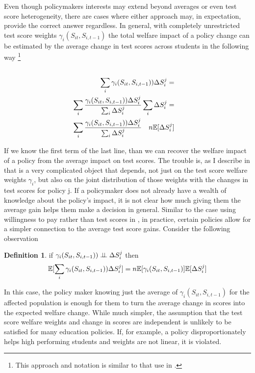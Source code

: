 \documentclass[12pt]{article}
\theoremstyle{definition}
\theoremstyle{definition}
\theoremstyle{definition}
\theoremstyle{definition}
\newtheorem{definition}{Definition}
\begin{document}
    Even though policymakers interests may extend beyond averages or even test score heterogeneity, there are cases where either approach may, in expectation, provide the correct answer regardless. In general, with completely unrestricted test score weights $\gamma_i(S_{it}, S_{i,t-1})$ the total welfare impact of a policy change can be estimated by the average change in test scores across students in the following way \footnote{This approach and notation is similar to that use in \cite{Keyser_2020}. }
    \large
    \begin{align*}
       \\ \sum_i \gamma_i(S_{it}, S_{i,t-1})) \Delta S_i^j =&
       \\ \sum_i \frac{\gamma_i(S_{it}, S_{i,t-1}))\Delta S_i^j}{\sum_i \Delta S_i^j} \sum_i \Delta S_i^j =&
       \\ \sum_i \frac{\gamma_i(S_{it}, S_{i,t-1}))\Delta S_i^j}{\sum_i \Delta S_i^j} \quad n \mathbb{E}[\Delta S_i^j] 
    \end{align*}
      \normalsize 
    
    If we know the first term of the last line, than we can recover the welfare impact of a policy from the average impact on test scores. The trouble is, as I describe in \citet{mather_2022} that is a very complicated object that depends, not just on the test score welfare weights $\gamma_i$, but also on the joint distribution of those weights with the changes in test scores for policy j. If a policymaker does not already have a wealth of knowledge about the policy's impact, it is not clear how much giving them the average gain helps them make a decision in general. Similar to the case using willingness to pay rather than test scores in \citet{mather_2022}, in practice, certain policies allow for a simpler connection to the average test score gains. Consider the following observation 
    
    \large
    \begin{definition}
    \label{pol_indep}
    if $\gamma_i(S_{it}, S_{i,t-1})) \perp \!\!\! \perp \Delta S_i^j$ then 
    \begin{equation}
        \mathbb{E}[\sum_i \gamma_i(S_{it}, S_{i,t-1})) \Delta S_i^j]= n\mathbb{E}[\gamma_i(S_{it}, S_{i,t-1})]\mathbb{E}[\Delta S_i^j]
    \end{equation}
    \end{definition}
    
    \normalsize
    In this case, the policy maker knowing just the average of $\gamma_i(S_{it}, S_{i,t-1})$ for the affected population is enough for them to turn the average change in scores into the expected welfare change. While much simpler, the assumption that the test score welfare weights and change in scores are independent is unlikely to be satisfied for many education policies. If, for example, a policy disproportionately helps high performing students and weights are not linear, it is violated.
    
\end{document}

